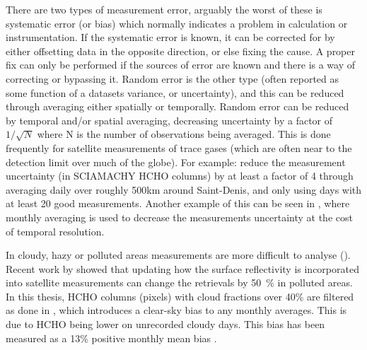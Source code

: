     There are two types of measurement error, arguably the worst of these is systematic error (or bias) which normally indicates a problem in calculation or instrumentation.
    If the systematic error is known, it can be corrected for by either offsetting data in the opposite direction, or else fixing the cause.
    A proper fix can only be performed if the sources of error are known and there is a way of correcting or bypassing it.
    Random error is the other type (often reported as some function of a datasets variance, or uncertainty), and this can be reduced through averaging either spatially or temporally. 
    Random error can be reduced by temporal and/or spatial averaging, decreasing uncertainty by a factor of $1/\sqrt{N}$ where N is the number of observations being averaged.
    This is done frequently for satellite measurements of trace gases (which are often near to the detection limit over much of the globe).
    For example: \textcite{Vigouroux2009} reduce the measurement uncertainty (in SCIAMACHY HCHO columns) by at least a factor of 4 through averaging daily over roughly 500km around Saint-Denis, and only using days with at least 20 good measurements.
    Another example of this can be seen in \textcite{Dufour2009}, where monthly averaging is used to decrease the measurements uncertainty at the cost of temporal resolution.
    
    
    
    In cloudy, hazy or polluted areas measurements are more difficult to analyse (\cite[e.g.][]{Palmer2003,Marais2014}).
    Recent work by \textcite{Vasilkov2017} showed that updating how the surface reflectivity is incorporated into satellite measurements can change the retrievals by 50~\% in polluted areas.
    In this thesis, HCHO columns (pixels) with cloud fractions over 40\% are filtered as done in \textcite{Palmer2001}, which introduces a clear-sky bias to any monthly averages.
    This is due to HCHO being lower on unrecorded cloudy days.
    This bias has been measured as a 13\% positive monthly mean bias \parencite{Palmer2001, Surl2018}.
    
